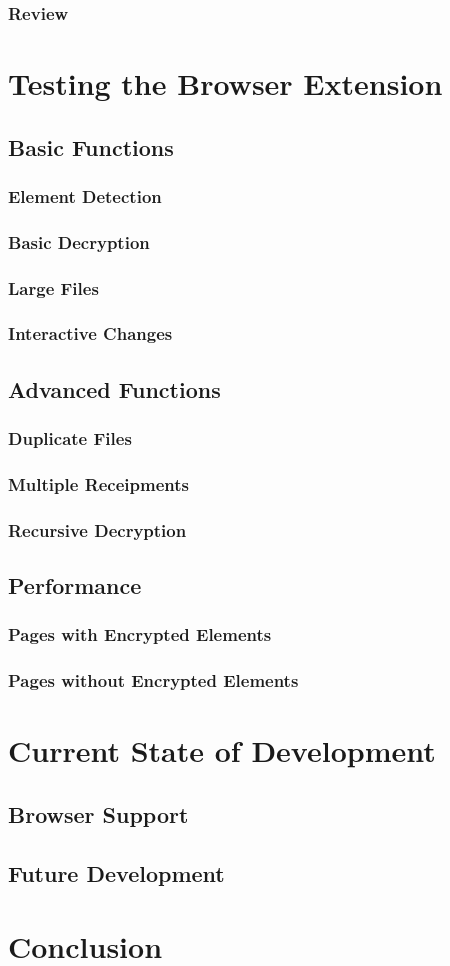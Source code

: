 \subsection{Review}

\chapter{Testing the Browser Extension}
\section{Basic Functions}
\subsection{Element Detection}
\subsection{Basic Decryption}
\subsection{Large Files}
\subsection{Interactive Changes}

\section{Advanced Functions}
\subsection{Duplicate Files}
\subsection{Multiple Receipments}
\subsection{Recursive Decryption}

\section{Performance}
\subsection{Pages with Encrypted Elements}
\subsection{Pages without Encrypted Elements}

\chapter{Current State of Development} %
\section{Browser Support}
\section{Future Development}

\chapter{Conclusion}
